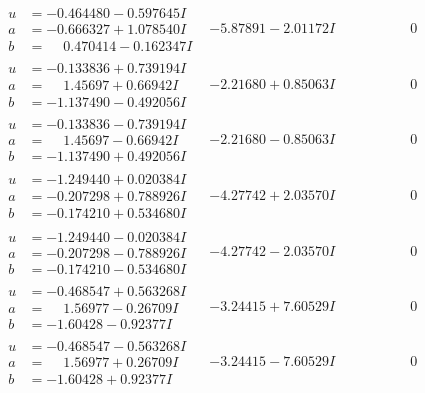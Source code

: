 \documentclass[1p]{elsarticle_modified}
\theoremstyle{definition}
\begin{document}
$$\begin{array}{c|c|c}
\begin{aligned}
u &= -0.464480 - 0.597645 I \\
a &= -0.666327 + 1.078540 I \\
b &= \phantom{-}0.470414 - 0.162347 I\end{aligned}
 & -5.87891 - 2.01172 I & \phantom{-0.000000 } 0 \\ \hline\begin{aligned}
u &= -0.133836 + 0.739194 I \\
a &= \phantom{-}1.45697 + 0.66942 I \\
b &= -1.137490 - 0.492056 I\end{aligned}
 & -2.21680 + 0.85063 I & \phantom{-0.000000 } 0 \\ \hline\begin{aligned}
u &= -0.133836 - 0.739194 I \\
a &= \phantom{-}1.45697 - 0.66942 I \\
b &= -1.137490 + 0.492056 I\end{aligned}
 & -2.21680 - 0.85063 I & \phantom{-0.000000 } 0 \\ \hline\begin{aligned}
u &= -1.249440 + 0.020384 I \\
a &= -0.207298 + 0.788926 I \\
b &= -0.174210 + 0.534680 I\end{aligned}
 & -4.27742 + 2.03570 I & \phantom{-0.000000 } 0 \\ \hline\begin{aligned}
u &= -1.249440 - 0.020384 I \\
a &= -0.207298 - 0.788926 I \\
b &= -0.174210 - 0.534680 I\end{aligned}
 & -4.27742 - 2.03570 I & \phantom{-0.000000 } 0 \\ \hline\begin{aligned}
u &= -0.468547 + 0.563268 I \\
a &= \phantom{-}1.56977 - 0.26709 I \\
b &= -1.60428 - 0.92377 I\end{aligned}
 & -3.24415 + 7.60529 I & \phantom{-0.000000 } 0 \\ \hline\begin{aligned}
u &= -0.468547 - 0.563268 I \\
a &= \phantom{-}1.56977 + 0.26709 I \\
b &= -1.60428 + 0.92377 I\end{aligned}
 & -3.24415 - 7.60529 I & \phantom{-0.000000 } 0 \\ \hline\begin{aligned}

\end{aligned}
\end{array}$$
\end{document}
